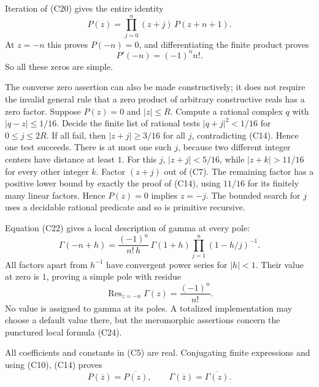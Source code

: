 Iteration of (C20) gives the entire identity
\[
 P(z)=\prod_{j=0}^{n}(z+j)\,P(z+n+1).
 \tag{C22}
\]
At $z=-n$ this proves $P(-n)=0$, and differentiating the finite product
proves
\[
 P'(-n)=(-1)^n n!.
 \tag{C23}
\]
So all these zeros are simple.

The converse zero assertion can also be made constructively; it does
not require the invalid general rule that a zero product of arbitrary
constructive reals has a zero factor.  Suppose $P(z)=0$ and $|z|\leq R$.
Compute a rational complex $q$ with $|q-z|\leq1/16$.  Decide the finite
list of rational tests $|q+j|^2<1/16$ for $0\leq j\leq2R$.
If all fail, then $|z+j|\geq3/16$ for all $j$, contradicting (C14).
Hence one test succeeds.  There is at most one such $j$, because two
different integer centers have distance at least $1$.  For this $j$,
$|z+j|<5/16$, while $|z+k|>11/16$ for every other integer $k$.
Factor $(z+j)$ out of (C7).  The remaining factor has a positive lower
bound by exactly the proof of (C14), using $11/16$ for its finitely many
linear factors.  Hence $P(z)=0$ implies $z=-j$.  The bounded search for
$j$ uses a decidable rational predicate and so is primitive recursive.

Equation (C22) gives a local description of gamma at every pole:
\[
 \Gamma(-n+h)=
 \frac{(-1)^n}{n!\,h}\,
 \Gamma(1+h)\prod_{j=1}^n(1-h/j)^{-1}.
 \tag{C24}
\]
All factors apart from $h^{-1}$ have convergent power series for
$|h|<1$.  Their value at zero is $1$, proving a simple pole with residue
\[
 \operatorname{Res}_{z=-n}\Gamma(z)=\frac{(-1)^n}{n!}.
 \tag{C25}
\]
No value is assigned to gamma at its poles.  A totalized implementation
may choose a default value there, but the meromorphic assertions concern
the punctured local formula (C24).

All coefficients and constants in (C5) are real.  Conjugating finite
expressions and using (C10), (C14) proves
\[
 P(\overline z)=\overline{P(z)},\qquad
 \Gamma(\overline z)=\overline{\Gamma(z)}.
 \tag{C26}
\]

